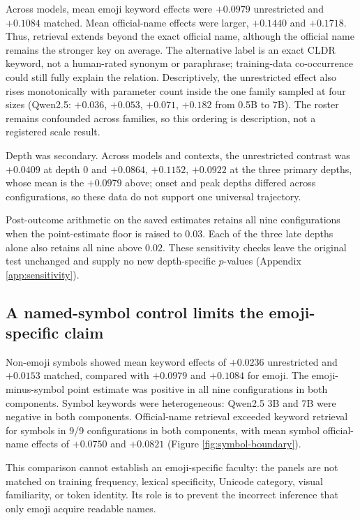 \documentclass{article}
\begin{document}
Across models, mean emoji keyword effects were $+0.0979$ unrestricted and
$+0.1084$ matched. Mean official-name effects were larger, $+0.1440$ and
$+0.1718$. Thus, retrieval extends beyond the exact official name, although
the official name remains the stronger key on average. The alternative label
is an exact CLDR keyword, not a human-rated synonym or paraphrase;
training-data co-occurrence could still fully explain the relation.
Descriptively, the unrestricted effect also rises monotonically with
parameter count inside the one family sampled at four sizes (Qwen2.5:
$+0.036$, $+0.053$, $+0.071$, $+0.182$ from 0.5B to 7B). The roster remains
confounded across families, so this ordering is description, not a registered
scale result.

Depth was secondary. Across models and contexts, the unrestricted contrast
was $+0.0409$ at depth 0 and $+0.0864$, $+0.1152$, $+0.0922$ at the three
primary depths, whose mean is the $+0.0979$ above; onset and peak depths
differed across configurations, so these data do not support one universal
trajectory.

Post-outcome arithmetic on the saved estimates retains all nine configurations
when the point-estimate floor is raised to $0.03$. Each of the three late
depths alone also retains all nine above $0.02$. These sensitivity checks
leave the original test unchanged and supply no new depth-specific $p$-values
(Appendix \ref{app:sensitivity}).

\subsection{A named-symbol control limits the emoji-specific claim}

Non-emoji symbols showed mean keyword effects of $+0.0236$ unrestricted and
$+0.0153$ matched, compared with $+0.0979$ and $+0.1084$ for emoji. The
emoji-minus-symbol point estimate was positive in all nine configurations in both
components. Symbol keywords were heterogeneous: Qwen2.5 3B and 7B were
negative in both components. Official-name retrieval exceeded keyword retrieval
for symbols in 9/9 configurations in both components, with mean symbol official-name effects
of $+0.0750$ and $+0.0821$ (Figure \ref{fig:symbol-boundary}).

This comparison cannot establish an emoji-specific faculty: the panels are
not matched on training frequency, lexical specificity, Unicode category,
visual familiarity, or token identity. Its role is to prevent the incorrect
inference that only emoji acquire readable names.
\end{document}
